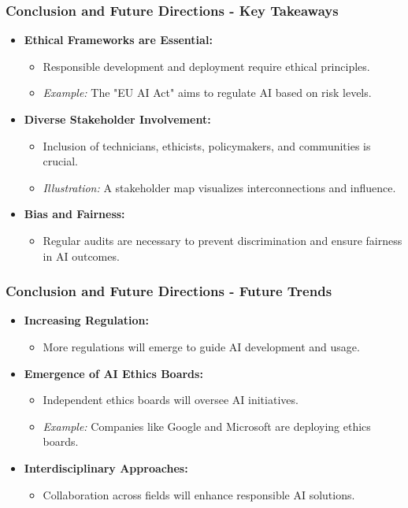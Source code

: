 \documentclass{beamer}
\begin{document}
\begin{frame}[fragile]
    \frametitle{Conclusion and Future Directions - Key Takeaways}
    \begin{itemize}
        \item \textbf{Ethical Frameworks are Essential:} 
        \begin{itemize}
            \item Responsible development and deployment require ethical principles.
            \item \textit{Example:} The "EU AI Act" aims to regulate AI based on risk levels.
        \end{itemize}
        
        \item \textbf{Diverse Stakeholder Involvement:} 
        \begin{itemize}
            \item Inclusion of technicians, ethicists, policymakers, and communities is crucial.
            \item \textit{Illustration:} A stakeholder map visualizes interconnections and influence.
        \end{itemize}
        
        \item \textbf{Bias and Fairness:} 
        \begin{itemize}
            \item Regular audits are necessary to prevent discrimination and ensure fairness in AI outcomes.
        \end{itemize}
    \end{itemize}
\end{frame}

\begin{frame}[fragile]
    \frametitle{Conclusion and Future Directions - Future Trends}
    \begin{itemize}
        \item \textbf{Increasing Regulation:} 
        \begin{itemize}
            \item More regulations will emerge to guide AI development and usage.
        \end{itemize}
        
        \item \textbf{Emergence of AI Ethics Boards:} 
        \begin{itemize}
            \item Independent ethics boards will oversee AI initiatives.
            \item \textit{Example:} Companies like Google and Microsoft are deploying ethics boards.
        \end{itemize}
        
        \item \textbf{Interdisciplinary Approaches:} 
        \begin{itemize}
            \item Collaboration across fields will enhance responsible AI solutions.
        \end{itemize}
    \end{itemize}
\end{frame}
\end{document}
